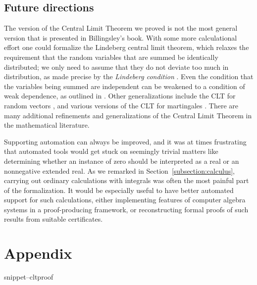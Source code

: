 \documentclass{svjour3}
\newcommand{\Snippet}[1]{\csname snippet--#1\endcsname}
\begin{document}
\subsection{Future directions}

The version of the Central Limit Theorem we proved is not the most general version that is presented in Billingsley's book. With some more calculational effort one could formalize the Lindeberg central limit theorem, which relaxes the requirement that the random variables that are summed be identically distributed; we only need to assume that they do not deviate too much in distribution, as made precise by the {\em Lindeberg condition} \cite[p.~359]{billingsley:95}. Even the condition that the variables being summed are independent can be weakened to a condition of weak dependence, as outlined in \cite[p.~363]{billingsley:95}. Other generalizations include the CLT for random vectors \cite[p.~385]{billingsley:95}, and various versions of the CLT for martingales \cite[pp.~475--478]{billingsley:95}. There are many additional refinements and generalizations of the Central Limit Theorem in the mathematical literature.

Supporting automation can always be improved, and it was at times frustrating that automated tools would get stuck on seemingly trivial matters like determining whether an instance of zero should be interpreted as a real or an nonnegative extended real. As we remarked in Section~\ref{subsection:calculus}, carrying out ordinary calculations with integrals was often the most painful part of the formalization. It would be especially useful to have better automated support for such calculations, either implementing features of computer algebra systems in a proof-producing framework, or reconstructing formal proofs of such results from suitable certificates.




\section*{Appendix}

\Snippet{cltproof}
\end{document}
